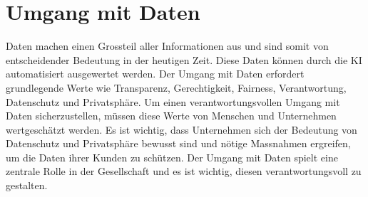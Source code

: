 \chapter{Umgang mit Daten}
\label{chap:Daten}

Daten machen einen Grossteil aller Informationen aus und sind somit von entscheidender Bedeutung in der heutigen Zeit. Diese Daten können durch die KI automatisiert ausgewertet werden. Der Umgang mit Daten erfordert grundlegende Werte wie Transparenz, Gerechtigkeit, Fairness, Verantwortung, Datenschutz und Privatsphäre. Um einen verantwortungsvollen Umgang mit Daten sicherzustellen, müssen diese Werte von Menschen und Unternehmen wertgeschätzt werden. Es ist wichtig, dass Unternehmen sich der Bedeutung von Datenschutz und Privatsphäre bewusst sind und nötige Massnahmen ergreifen, um die Daten ihrer Kunden zu schützen. Der Umgang mit Daten spielt eine zentrale Rolle in der Gesellschaft und es ist wichtig, diesen verantwortungsvoll zu gestalten.